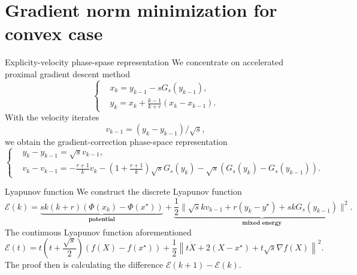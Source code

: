 \documentclass[10pt]{beamer}
\begin{document}
\section{Gradient norm minimization for convex case}
\begin{frame}{Explicity-velocity phase-spase representation}
  We concentrate on accelerated proximal gradient descent method
  \begin{equation*}
    \left\{\begin{aligned}
      & x_{k} = y_{k-1} - sG_s(y_{k-1}),              \\
      & y_{k} = x_{k}  + \frac{k-1}{k+r}(x_{k} - x_{k-1}).
      \end{aligned}\right.
  \end{equation*}
  \pause
  With the velocity iterates
  \begin{equation*}
    v_{k-1}= (y_k - y_{k-1})/\sqrt{s},
  \end{equation*}
  we obtain the gradient-correction phase-space representation
  \begin{equation*}
    \label{phs}
    \left\{\begin{aligned}
      & y_k - y_{k-1} = \sqrt{s}v_{k-1},\\
      & v_k - v_{k-1} = -\frac{r+1}{k}v_k - \left(1 + \frac{r+1}{k}\right)\sqrt{s}G_s(y_k) - \sqrt{s}(G_s(y_k) - G_s(y_{k-1})).
      \end{aligned}\right.
  \end{equation*}
\end{frame}

\begin{frame}{Lyapunov function}
  We construct the discrete Lyapunov function 
  \begin{equation*}
     \mathcal{E}(k) = \underbrace{sk(k+r)(\Phi(x_k) - \Phi(x^\star))}_{\textbf{potential}} + \underbrace{\frac{1}{2}\|\sqrt{s}kv_{k-1} + r(y_k - y^\star) + skG_s(y_{k-1})\|^2}_{\textbf{mixed\ energy}}.
  \end{equation*} 
  \pause
  The continuous Lyapunov function aforementioned
  \begin{equation*}
    \mathcal{E}(t) = t\left(t+\frac{\sqrt{s}}{2}\right)(f(X) - f(x^\star)) + \frac{1}{2}\left\|t\dot{X} + 2(X - x^\star) + t\sqrt{s}\nabla f(X)\right\|^2.
  \end{equation*}
  \pause
  The proof then is calculating the difference $\mathcal{E}(k+1) - \mathcal{E}(k)$.
\end{frame}
\end{document}
